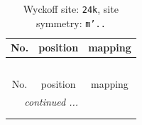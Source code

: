 \documentclass[fleqn,8pt]{jsarticle}
\begin{document}
\renewcommand{\arraystretch}{1.2}
\begin{longtable}{ccc}
\caption{Wyckoff site: {\tt 24k}, site symmetry: {\tt m'..}}
 \\
 \hline \hline
No. & position & mapping \\ \hline \endfirsthead

\multicolumn{2}{l}{\tablename\ \thetable{}} \\
 \hline \hline
No. & position & mapping \\ \hline \endhead

 \hline \hline
\multicolumn{2}{r}{\footnotesize\it continued ...} \\ \endfoot

 \hline \hline
\multicolumn{2}{r}{} \\ \endlastfoot


\end{longtable}
\end{document}
